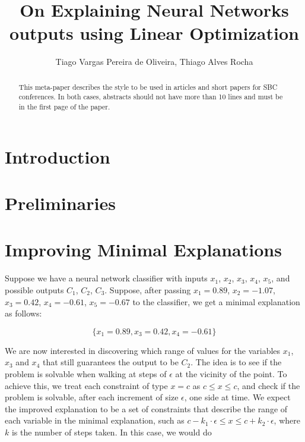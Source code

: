 \documentclass[12pt]{article}
\title{On Explaining Neural Networks outputs using Linear Optimization}
\author{Tiago Vargas Pereira de Oliveira\inst{1}, Thiago Alves Rocha\inst{1}}
\begin{document}
\maketitle

\begin{abstract}
	This meta-paper describes the style to be used in articles and short papers for SBC conferences. In both cases, abstracts should not have more than 10 lines and must be in the first page of the paper.
\end{abstract}

\section{Introduction}

\section{Preliminaries}

\section{Improving Minimal Explanations}



Suppose we have a neural network classifier with inputs $x_1$, $x_2$, $x_3$, $x_4$, $x_5$, and possible outputs $C_1$, $C_2$, $C_3$. Suppose, after passing $x_1 = 0.89$, $x_2 = -1.07$, $x_3 = 0.42$, $x_4 = -0.61$, $x_5 = -0.67$ to the classifier, we get a minimal explanation as follows:

\[
\{x_1 = 0.89, x_3 = 0.42, x_4 = -0.61\}
\]

We are now interested in discovering which range of values for the variables $x_1$, $x_3$ and $x_4$ that still guarantees the output to be $C_2$. The idea is to see if the problem is solvable when walking at steps of $\epsilon$ at the vicinity of the point. To achieve this, we treat each constraint of type $x = c$ as $c \le x \le c$, and check if the problem is solvable, after each increment of size $\epsilon$, one side at time. We expect the improved explanation to be a set of constraints that describe the range of each variable in the minimal explanation, such as $c - k_1 \cdot \epsilon \le x \le c + k_2 \cdot \epsilon$, where $k$ is the number of steps taken. In this case, we would do
\end{document}
